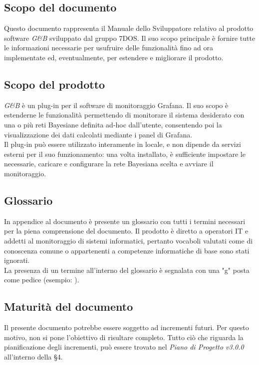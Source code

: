 \subsection{Scopo del documento}
Questo documento rappresenta il Manuale dello Sviluppatore relativo al prodotto software \emph{G\&B} sviluppato dal gruppo 7DOS. Il suo scopo principale è fornire tutte le informazioni necessarie per usufruire delle funzionalità fino ad ora implementate ed, eventualmente, per estendere e migliorare il prodotto.
\subsection{Scopo del prodotto}
\emph{G\&B} è un plug-in per il software di monitoraggio Grafana. Il suo scopo è estenderne le funzionalità permettendo di monitorare il sistema desiderato con una o più reti Bayesiane definita ad-hoc dall'utente, consentendo poi la visualizzazione dei dati calcolati mediante i panel di Grafana.
\\
Il plug-in può essere utilizzato interamente in locale, e non dipende da servizi esterni per il suo funzionamento: una volta installato, è sufficiente impostare le  necessarie, caricare e configurare la rete Bayesiana scelta e avviare il monitoraggio.

\subsection{Glossario}
In appendice al documento è presente un glossario con tutti i termini necessari per la piena comprensione del documento. Il prodotto è diretto a operatori IT e addetti al monitoraggio di sistemi informatici, pertanto vocaboli valutati come di conoscenza comune o appartenenti a competenze informatiche di base sono stati ignorati.\\
La presenza di un termine all'interno del glossario è segnalata con una "g" posta come pedice (esempio: ).
\subsection{Maturità del documento}
Il presente documento potrebbe essere soggetto ad incrementi futuri. Per questo motivo, non si pone l'obiettivo di risultare completo.
Tutto ciò che riguarda la pianificazione degli incrementi, può essere trovato nel \emph{Piano di Progetto v3.0.0} all'interno della §4.
\pagebreak